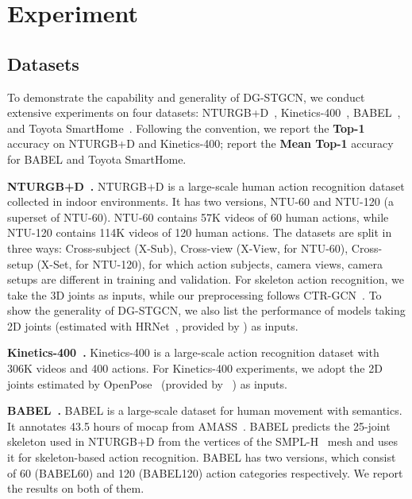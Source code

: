 \section{Experiment}

\subsection{Datasets}

To demonstrate the capability and generality of DG-STGCN, 
we conduct extensive experiments on four datasets: NTURGB+D~\cite{liu2020ntu,shahroudy2016ntu}, Kinetics-400~\cite{carreira2017quo}, 
BABEL~\cite{punnakkal2021babel}, and Toyota SmartHome~\cite{Das_2019_ICCV}. 
Following the convention, we report the \textbf{Top-1} accuracy on NTURGB+D and Kinetics-400; report the \textbf{Mean Top-1} accuracy for BABEL and Toyota SmartHome.

\noindent
\textbf{NTURGB+D~\cite{liu2020ntu,shahroudy2016ntu}. } 
NTURGB+D is a large-scale human action recognition dataset collected in indoor environments. 
It has two versions, NTU-60 and NTU-120 (a superset of NTU-60).
NTU-60 contains 57K videos of 60 human actions, while NTU-120 contains 114K videos of 120 human actions. 
The datasets are split in three ways: Cross-subject (X-Sub), Cross-view (X-View, for NTU-60), Cross-setup (X-Set, for NTU-120), for which action subjects, camera views, camera setups are different in training and validation.
For skeleton action recognition, we take the 3D joints as inputs, while our preprocessing follows CTR-GCN~\cite{chen2021channel}. 
To show the generality of DG-STGCN, we also list the performance of models taking 2D joints (estimated with HRNet~\cite{sun2019deep}, provided by \cite{duan2021revisiting}) as inputs.   

\noindent
\textbf{Kinetics-400~\cite{carreira2017quo}. }
Kinetics-400 is a large-scale action recognition dataset with 306K videos and 400 actions. 
For Kinetics-400 experiments, we adopt the 2D joints estimated by OpenPose~\cite{8765346} (provided by ~\cite{yan2018spatial}) as inputs.

\noindent
\textbf{BABEL~\cite{punnakkal2021babel}. }
BABEL is a large-scale dataset for human movement with semantics. 
It annotates 43.5 hours of mocap from AMASS~\cite{mahmood2019amass}. 
BABEL predicts the 25-joint skeleton used in NTURGB+D from the vertices of the SMPL-H~\cite{romero2022embodied} mesh and uses it for skeleton-based action recognition.
BABEL has two versions, which consist of 60 (BABEL60) and 120 (BABEL120) action categories respectively. 
We report the results on both of them. 

